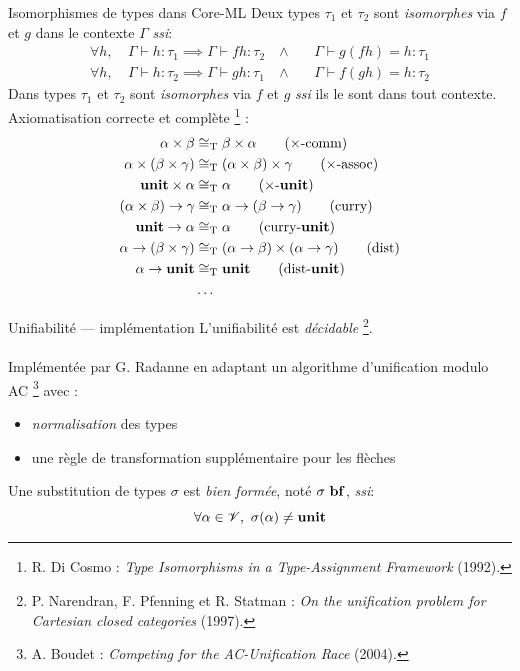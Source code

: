 \documentclass[serif]{beamer}
\newcommand{\ssi}{\textit{ssi}\xspace}
\newcommand{\unit}{\bold{unit}}
\newcommand{\V}{\mathscr{V}}
\newcommand{\T}{\mathrm{T}}
\begin{document}
\begin{frame}{Isomorphismes de types dans Core-ML}
\small
Deux types $\tau_1$ et $\tau_2$ sont \emph{isomorphes} via $f$ et $g$ dans le contexte $\Gamma$ \ssi :
\begin{align*}
		\forall h,\ &
		\Gamma \vdash h : \tau_1 \implies \Gamma \vdash f h : \tau_2 \ &
		\wedge\ &&
		\Gamma \vdash g (f h) = h : \tau_1
	\\
		\forall h,\ &
		\Gamma \vdash h : \tau_2 \implies \Gamma \vdash g h : \tau_1 \ &
		\wedge\ &&
		\Gamma \vdash f (g h) = h : \tau_2
\end{align*}
Dans types $\tau_1$ et $\tau_2$ sont \emph{isomorphes} via $f$ et $g$ \ssi ils le sont dans tout contexte. \\
Axiomatisation correcte et complète \footnote{R. Di Cosmo : \textit{Type Isomorphisms in a Type-Assignment Framework} (1992).} :
\begin{align*}
		\alpha \times \beta &\cong_\T
		\beta \times \alpha
		\label{prod_comm}
		\tag{$\times$-comm}
	\\
		\alpha \times (\beta \times \gamma) &\cong_\T
		(\alpha \times \beta) \times \gamma
		\label{prod_assoc}
		\tag{$\times$-assoc}
	\\
		\unit \times \alpha &\cong_\T
		\alpha
		\label{prod_unit}
		\tag{$\times$-$\unit$}
	\\
		(\alpha \times \beta) \rightarrow \gamma &\cong_\T
		\alpha \rightarrow (\beta \rightarrow \gamma)
		\label{curry}
		\tag{curry}
	\\
		\unit \rightarrow \alpha &\cong_\T
		\alpha
		\label{curry_unit}
		\tag{curry-$\unit$}
	\\
		\alpha \rightarrow (\beta \times \gamma) &\cong_\T
		(\alpha \rightarrow \beta) \times (\alpha \rightarrow \gamma)
		\label{dist}
		\tag{dist}
	\\
		\alpha \rightarrow \unit &\cong_\T
		\unit
		\label{dist_unit}
		\tag{dist-$\unit$}
	\\
		&\dots
\end{align*}
\end{frame}


\begin{frame}{Unifiabilité — implémentation}
\small
L'unifiabilité est \emph{décidable} \footnote{P. Narendran, F. Pfenning et R. Statman : \textit{On the unification problem for Cartesian closed categories} (1997).}.
\\~\\
Implémentée par G. Radanne en adaptant un algorithme d'unification modulo AC \footnote{A. Boudet : \textit{Competing for the AC-Unification Race} (2004).} avec :
\begin{itemize}
	\item \emph{normalisation} des types
	\item une règle de transformation supplémentaire pour les flèches
\end{itemize}
\smallskip
Une substitution de types $\sigma$ est \emph{bien formée}, noté $\sigma\ \bold{bf}$, \ssi :
	\[ \forall \alpha \in \V,\ \sigma (\alpha) \neq \unit \]
\end{frame}
\end{document}
